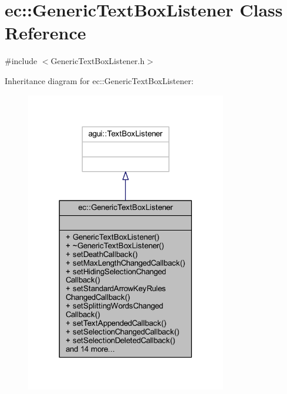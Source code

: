 \hypertarget{classec_1_1_generic_text_box_listener}{}\section{ec\+:\+:Generic\+Text\+Box\+Listener Class Reference}
\label{classec_1_1_generic_text_box_listener}


{\ttfamily \#include $<$Generic\+Text\+Box\+Listener.\+h$>$}



Inheritance diagram for ec\+:\+:Generic\+Text\+Box\+Listener\+:\nopagebreak
\begin{figure}[H]
\begin{center}
\leavevmode
\includegraphics[width=249pt]{classec_1_1_generic_text_box_listener__inherit__graph}
\end{center}
\end{figure}


